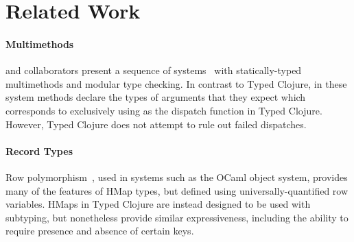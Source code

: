 \section{Related Work}

\paragraph{Multimethods} 
\cite{MS02} and collaborators present a sequence of
systems~\cite{Chambers:1992:OMC,Chambers:1994:TMM,MS02} with statically-typed multimethods
and modular type checking.  In contrast to Typed Clojure, in these
system methods declare the types of arguments that they expect which
corresponds to exclusively using  as the dispatch function
in Typed Clojure. However, Typed Clojure does not attempt to rule out
failed dispatches.







\paragraph{Record Types} Row polymorphism~\cite{Wand89typeinference,CM91,HP91}, used
in systems such as the OCaml object system, provides many of the
features of HMap types, but defined using universally-quantified row
variables. HMaps in Typed Clojure are instead designed to be used with
subtyping, but nonetheless provide similar expressiveness, including
the ability to require presence and absence of certain keys. 

